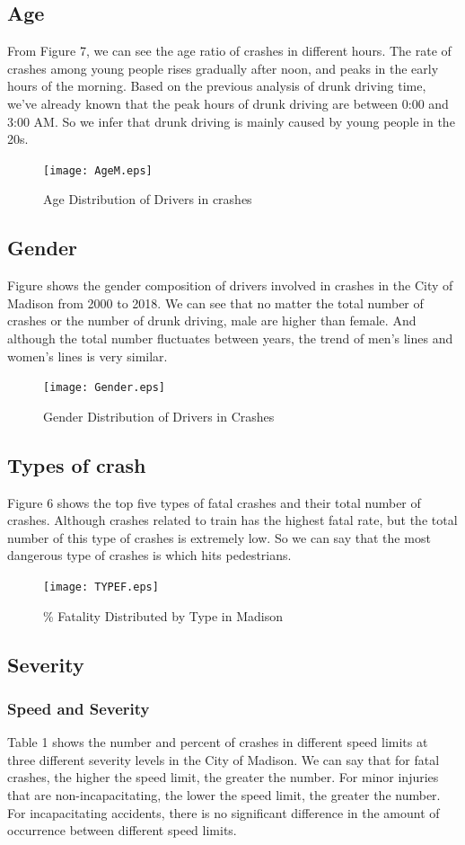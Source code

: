 \documentclass[15pt]{article}
\begin{document}
\subsection{Age}
From Figure 7, we can see the age ratio of crashes in different hours. The rate of crashes among young people rises gradually after noon, and peaks in the early hours of the morning. Based on the previous analysis of drunk driving time, we've already known that the peak hours of drunk driving are between 0:00 and 3:00 AM. So we infer that drunk driving is mainly caused by young people in the 20s.
\begin{figure}[H]
\centering
\texttt{[image: AgeM.eps]}
\caption{Age Distribution of Drivers in crashes}
\label{11}
\end{figure}

\newpage
\subsection{Gender}
Figure  shows the gender composition of drivers involved in crashes in the City of Madison from 2000 to 2018. We can see that no matter the total number of crashes or the number of drunk driving, male are higher than female. And although the total number fluctuates between years, the trend of men's lines and women's lines is very similar. 
\begin{figure}[H]
\centering
\texttt{[image: Gender.eps]}
\caption{Gender Distribution of Drivers in Crashes}
\label{13}
\end{figure}

\newpage
\subsection{Types of crash}
Figure 6 shows the top five types of fatal crashes and their total number of crashes. Although crashes related to train has the highest fatal rate, but the total number of this type of crashes is extremely low. So we can say that the most dangerous type of crashes is which hits pedestrians. 
\begin{figure}[H]
\centering
\texttt{[image: TYPEF.eps]}
\caption{\% Fatality Distributed by Type in Madison}
\label{16}
\end{figure}

\newpage
\subsection{Severity}
\subsubsection{Speed and Severity}
Table 1 shows the number and percent of crashes in different speed limits at three different severity levels in the City of Madison. We can say that for fatal crashes, the higher the speed limit, the greater the number. For minor injuries that are non-incapacitating, the lower the speed limit, the greater the number. For incapacitating accidents, there is no significant difference in the amount of occurrence between different speed limits.
\end{document}
